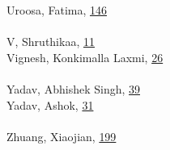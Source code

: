 \documentclass[11pt,oneside]{book}
\begin{document}
\begin{multicols}{2}
Uroosa, Fatima, \hyperlink{page.146}{146}\\
\\ %
V, Shruthikaa, \hyperlink{page.11}{11}\\
Vignesh, Konkimalla Laxmi, \hyperlink{page.26}{26}\\
\\ %
Yadav, Abhishek Singh, \hyperlink{page.39}{39}\\
Yadav, Ashok, \hyperlink{page.31}{31}\\
\\ %
Zhuang, Xiaojian, \hyperlink{page.199}{199}\\
\\ %
\end{multicols}
\end{document}

